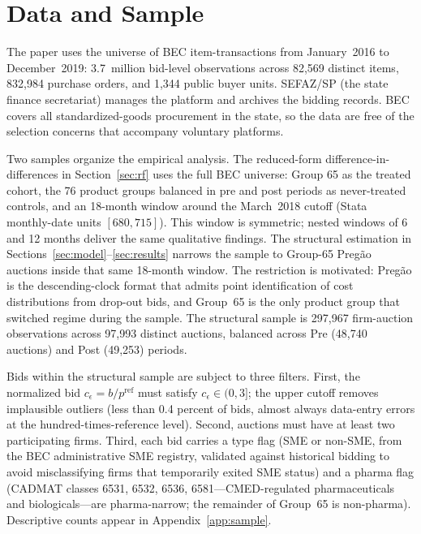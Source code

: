 \section{Data and Sample}\label{sec:data}

The paper uses the universe of BEC item-transactions from January~2016 to December~2019: 3.7~million bid-level observations across 82{,}569 distinct items, 832{,}984 purchase orders, and 1{,}344 public buyer units. SEFAZ/SP (the state finance secretariat) manages the platform and archives the bidding records. BEC covers all standardized-goods procurement in the state, so the data are free of the selection concerns that accompany voluntary platforms.

Two samples organize the empirical analysis. The reduced-form difference-in-differences in Section~\ref{sec:rf} uses the full BEC universe: Group 65 as the treated cohort, the 76 product groups balanced in pre and post periods as never-treated controls, and an 18-month window around the March~2018 cutoff (Stata monthly-date units $[680, 715]$). This window is symmetric; nested windows of 6 and 12 months deliver the same qualitative findings. The structural estimation in Sections~\ref{sec:model}--\ref{sec:results} narrows the sample to Group-65 Preg\~ao auctions inside that same 18-month window. The restriction is motivated: Preg\~ao is the descending-clock format that admits point identification of cost distributions from drop-out bids, and Group~65 is the only product group that switched regime during the sample. The structural sample is 297{,}967 firm-auction observations across 97{,}993 distinct auctions, balanced across Pre (48{,}740 auctions) and Post (49{,}253) periods.

Bids within the structural sample are subject to three filters. First, the normalized bid $c_\epsilon = b / p^{\mathrm{ref}}$ must satisfy $c_\epsilon \in (0, 3]$; the upper cutoff removes implausible outliers (less than 0.4 percent of bids, almost always data-entry errors at the hundred-times-reference level). Second, auctions must have at least two participating firms. Third, each bid carries a type flag (SME or non-SME, from the BEC administrative SME registry, validated against historical bidding to avoid misclassifying firms that temporarily exited SME status) and a pharma flag (CADMAT classes 6531, 6532, 6536, 6581---CMED-regulated pharmaceuticals and biologicals---are pharma-narrow; the remainder of Group~65 is non-pharma). Descriptive counts appear in Appendix~\ref{app:sample}.

